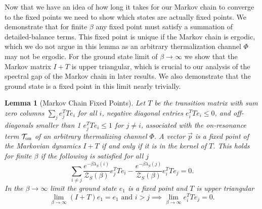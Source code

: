 \documentclass[
 amsmath,amssymb,
 aps,
onecolumn, 
nofootinbib]{revtex4-2}
\newtheorem{lemma}[theorem]{Lemma}
\newcommand{\on}{\rm on}
\newcommand{\TT}{\mathcal{T}}
\newcommand{\partfun}{\mathcal{Z}}
\begin{document}
Now that we have an idea of how long it takes for our Markov chain to converge to the fixed points we need to show which states are actually fixed points. We demonstrate that for finite $\beta$ any fixed point must satisfy a summation of detailed-balance terms. This fixed point is unique if the Markov chain is ergodic, which we do not argue in this lemma as an arbitrary thermalization channel $\Phi$ may not be ergodic. For the ground state limit of $\beta \to \infty$ we show that the Markov matrix $I + T$ is upper triangular, which is crucial to our analysis of the spectral gap of the Markov chain in later results. We also demonstrate that the ground state is a fixed point in this limit nearly trivially.
\begin{lemma}[Markov Chain Fixed Points]\label{lem:fixed_point}
    Let $T$ be the transition matrix with sum zero columns $\sum_j e_j^T T e_i$ for all $i$, negative diagonal entries $e_i^T T e_i \leq 0$, and off-diagonals smaller than 1 $e_j^T T e_i \leq 1$ for $j \neq i$, associated with the on-resonance term $\TT_{\on}$ of an arbitrary thermalizing channel $\Phi$. A vector $\vec{p}$ is a fixed point of the Markovian dynamics $I + T$ if and only if it is in the kernel of $T$. This holds for finite $\beta$ if the following is satisfied for all $j$
    \begin{equation}
        \sum_{i \neq j} \frac{e^{-\beta \lambda_S(i)}}{\partfun_S(\beta)} e_j^T T e_i - \frac{e^{-\beta \lambda_S(j)}}{\partfun_S(\beta)} e_i^T T e_j = 0.\label{eq:detailed_balance}
    \end{equation}
    In the $\beta \to \infty$ limit the ground state $e_1$ is a fixed point and $T$ is upper triangular
    \begin{equation}
        \lim_{\beta \to \infty} (I + T) e_1 = e_1 \text{ and }i > j \implies \lim_{\beta \to \infty} e_i^T T e_j = 0.
    \end{equation}
\end{lemma}
\end{document}

